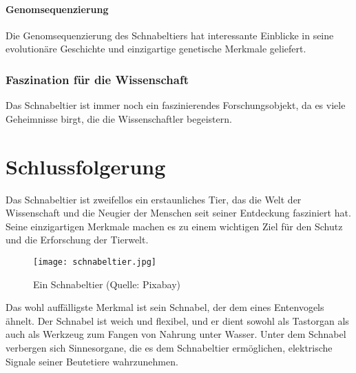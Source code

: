 \documentclass{article}
\begin{document}
        \subsection{Genomsequenzierung}
        Die Genomsequenzierung des Schnabeltiers hat interessante Einblicke in seine evolutionäre Geschichte und einzigartige genetische Merkmale geliefert.

    \section{Faszination für die Wissenschaft}
    Das Schnabeltier ist immer noch ein faszinierendes Forschungsobjekt, da es viele Geheimnisse birgt, die die Wissenschaftler begeistern.


\part{Schlussfolgerung}
    Das Schnabeltier ist zweifellos ein erstaunliches Tier, das die Welt der Wissenschaft und die Neugier der Menschen seit seiner Entdeckung fasziniert hat.
    Seine einzigartigen Merkmale machen es zu einem wichtigen Ziel für den Schutz und die Erforschung der Tierwelt.

    \begin{figure}[h]
      \centering
      \texttt{[image: schnabeltier.jpg]}
      \caption{Ein Schnabeltier (Quelle: Pixabay)}
    \end{figure}

    Das wohl auffälligste Merkmal ist sein Schnabel, der dem eines Entenvogels ähnelt. Der Schnabel ist weich und flexibel, und er dient sowohl als Tastorgan als auch als Werkzeug zum Fangen von Nahrung unter Wasser.
    Unter dem Schnabel verbergen sich Sinnesorgane, die es dem Schnabeltier ermöglichen, elektrische Signale seiner Beutetiere wahrzunehmen.
\end{document}
